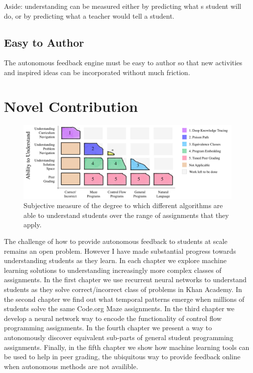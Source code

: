 Aside: understanding can be measured either by predicting what s student will do, or by predicting what a teacher would tell a student.

\subsection{Easy to Author}

The autonomous feedback engine must be easy to author so that new activities and inspired ideas can be incorporated without much friction.

\section{Novel Contribution}

\begin{figure}[h]
\center
   \includegraphics[width=1.0\textwidth]{img/intro-blocks.pdf}
\caption[Subjective contribution overview]{
Subjective measure of the degree to which different algorithms are able to understand students over the range of assignments that they apply.}
\label{fig:bigPicture}

\end{figure}

The challenge of how to provide autonomous feedback to students at scale remains an open problem. However I have made substantial progress towards understanding students as they learn. In each chapter we explore machine learning solutions to understanding increasingly more complex classes of assignments. 
In the first chapter we use recurrent neural networks to understand students as they solve correct/incorrect class of problems in Khan Academy. In the second chapter we find out what temporal patterns emerge when millions of students solve the same Code.org Maze assignments. In the third chapter we develop a neural network way to encode the functionality of control flow programming assignments. In the fourth chapter we present a way to autonomously discover equivalent sub-parts of general student programming assignments. Finally, in the fifth chapter we show how machine learning tools can be used to help in peer grading, the ubiquitous way to provide feedback online when autonomous methods are not availible.

